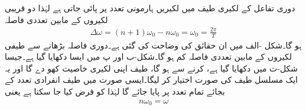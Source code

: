 دوری تفاعل کے لکیری طیف میں لکیریں ہارمونی تعدد  پر پائی جاتی ہے لہٰذا دو قریبی لکیروں کے مابین تعددی فاصلہ
\begin{align}
\Delta \omega=(n+1)\omega_0-n\omega_0 =\omega_0=\frac{2\pi}{T}
\end{align}
ہو گا۔شکل -الف میں ان حقائق کی وضاحت کی گئی ہے۔دوری فاصلہ  بڑھانے سے طیفی لکیروں کے مابین تعددی فاصلہ کم ہو گا۔شکل-ب اور پ میں ایسا دکھایا گیا ہے۔جیسا شکل-ت میں دکھایا گیا ہے،  کرنے سے  ہو گا، طیف اپنی لکیری خاصیت کھو دے گا اور یہ ایک مسلسل طیف کی صورت اختیار کر لیگا۔ایسی صورت میں طیف انفرادی تعدد  کے بجائے تمام تعدد  پر پایا جائے گا لہٰذا  کو  فرض کیا جا سکتا ہے یعنی
\begin{align}\label{مساوات_فوریئر_لامتناہی_دوری_عرصہ_تعددی_فرق}
n \omega_0 = \omega
\end{align}
%
